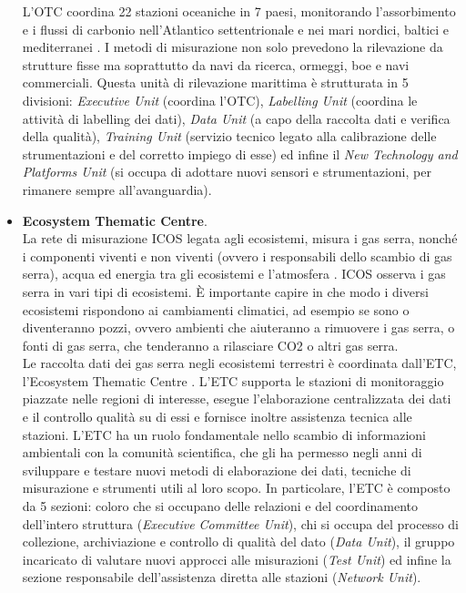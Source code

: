 \begin{itemize}
    L'OTC coordina 22 stazioni oceaniche in 7 paesi, monitorando
    l'assorbimento e i flussi di carbonio nell'Atlantico settentrionale
    e nei mari nordici, baltici e mediterranei \cite{ICOSOceanThematicCentre}.
    I metodi di misurazione non solo prevedono la rilevazione da strutture
    fisse ma
    soprattutto da navi da ricerca,
    ormeggi, boe e navi commerciali. Questa unità di rilevazione
    marittima è strutturata in 5 divisioni: 
    \textit{Executive Unit} (coordina l'OTC),
    \textit{Labelling Unit} (coordina le attività di
    labelling dei dati),
    \textit{Data Unit} (a capo della raccolta dati
    e verifica della qualità),
    \textit{Training Unit} (servizio tecnico legato
    alla calibrazione delle strumentazioni e del corretto
    impiego di esse) ed infine il
    \textit{New Technology and Platforms Unit} (si
    occupa di adottare nuovi sensori e strumentazioni,
    per rimanere sempre all'avanguardia).

    \item \textbf{Ecosystem Thematic Centre}.\\
    La rete di misurazione ICOS legata agli ecosistemi,
    misura i gas serra, nonché i componenti viventi
    e non viventi (ovvero i responsabili dello
    scambio di gas serra), acqua ed energia
    tra gli ecosistemi e l'atmosfera \cite{OceanObservationsICOS}. ICOS osserva
    i gas serra in vari tipi di ecosistemi.
    È importante capire in che modo i diversi
    ecosistemi rispondono ai cambiamenti climatici,
    ad esempio se sono o diventeranno pozzi, ovvero ambienti
    che aiuteranno a rimuovere i gas serra, o fonti
    di gas serra, che tenderanno a rilasciare CO2 o altri gas serra.\\

    Le raccolta dati dei gas serra negli ecosistemi terrestri
    è coordinata dall'ETC, l'Ecosystem Thematic Centre \cite{ICOSEcosystemThematicCentre}.
    L'ETC supporta le stazioni di monitoraggio piazzate nelle regioni
    di interesse, esegue l'elaborazione centralizzata
    dei dati e il controllo qualità su di essi e fornisce inoltre
    assistenza tecnica alle stazioni.
    L'ETC ha un ruolo fondamentale nello scambio di
    informazioni ambientali
    con la comunità scientifica, che gli ha permesso negli anni di
    sviluppare e testare nuovi metodi di
    elaborazione dei dati,
    tecniche di misurazione e strumenti utili al loro scopo. In particolare,
    l'ETC è composto da 5 sezioni: coloro che si occupano delle relazioni
    e del coordinamento dell'intero struttura (\textit{Executive Committee Unit}),
    chi si occupa del processo di collezione, archiviazione e controllo di
    qualità del dato (\textit{Data Unit}), il gruppo incaricato
    di valutare nuovi approcci alle misurazioni (\textit{Test Unit})
    ed infine la sezione responsabile dell'assistenza diretta alle
    stazioni (\textit{Network Unit}).
   


\end{itemize}


